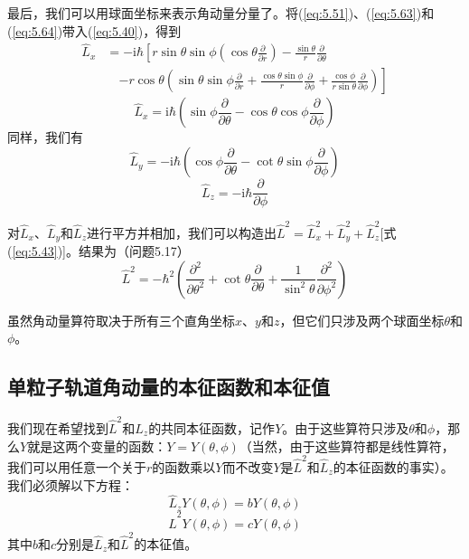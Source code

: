     最后，我们可以用球面坐标来表示角动量分量了。将(\ref{eq:5.51})、(\ref{eq:5.63})和(\ref{eq:5.64})带入(\ref{eq:5.40})，得到
    \begin{equation*}
        \begin{aligned}
            \hat{L}_x & = -\mathrm{i}\hbar\left[r\sin\theta\sin\phi\left(\cos\theta\frac{\partial}{\partial r}\right) - \frac{\sin\theta}{r}\frac{\partial }{\partial\theta}\right.\\
            &  \quad \left.-r\cos\theta\left(\sin\theta\sin\phi\frac{\partial}{\partial r} +\frac{\cos\theta\sin\phi}{r}\frac{\partial}{\partial \phi}+\frac{\cos\phi}{r\sin\theta}\frac{\partial}{\partial \phi}\right)\right]
        \end{aligned}
    \end{equation*}
    \begin{equation}
        \hat{L}_x = \mathrm{i}\hbar\left(\sin\phi\frac{\partial}{\partial \theta} - \cos\theta\cos\phi\frac{\partial}{\partial \phi}\right)
        \label{eq:5.65}
    \end{equation}
    同样，我们有
    \begin{equation}
        \hat{L}_y = -\mathrm{i}\hbar\left(\cos\phi\frac{\partial}{\partial \theta} - \cot\theta\sin\phi\frac{\partial}{\partial \phi}\right)
        \label{eq:5.66}
    \end{equation}
    \begin{equation}
        \hat{L}_z = -\mathrm{i}\hbar\frac{\partial}{\partial \phi}
        \label{eq:5.67}
    \end{equation}

    对$\hat{L}_x$、$\hat{L}_y$和$\hat{L}_z$进行平方并相加，我们可以构造出$\hat{L}^2 = \hat{L}_x^2 + \hat{L}_y^2 + \hat{L}_z^2$[式(\ref{eq:5.43})]。结果为（问题5.17）
    \begin{equation}
        \hat{L}^2 = -\hbar^2\left(\frac{\partial^2}{\partial\theta^2} + \cot\theta\frac{\partial}{\partial\theta} + \frac{1}{\sin^2\theta}\frac{\partial^2}{\partial \phi^2}\right)
        \label{eq:5.68}
    \end{equation}

    虽然角动量算符取决于所有三个直角坐标$x$、$y$和$z$，但它们只涉及两个球面坐标$\theta$和$\phi$。

\subsection*{单粒子轨道角动量的本征函数和本征值}
    我们现在希望找到$\hat{L}^2$和$\hat{L}_z$的共同本征函数，记作$Y$。由于这些算符只涉及$\theta$和$\phi$，那么$Y$就是这两个变量的函数：$Y = Y\left(\theta,\phi\right)$（当然，由于这些算符都是线性算符，我们可以用任意一个关于$r$的函数乘以$Y$而不改变$Y$是$\hat{L}^2$和$\hat{L}_z$的本征函数的事实）。我们必须解以下方程：
    \begin{equation}
        \hat{L}_zY\left(\theta,\phi\right) = bY\left(\theta,\phi\right)
        \label{eq:5.69}
    \end{equation}
    \begin{equation}
        \hat{L}^2Y\left(\theta,\phi\right) = cY\left(\theta,\phi\right)
        \label{eq:5.70}
    \end{equation}
    其中$b$和$c$分别是$\hat{L}_z$和$\hat{L}^2$的本征值。

